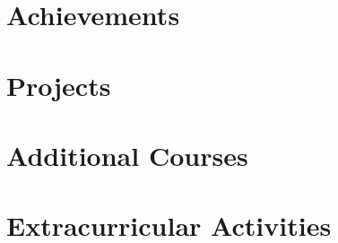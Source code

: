 \documentclass[letterpaper, 10pt]{article}
\begin{document}



\section{Achievements}
\label{achievements}




\section{Projects}
\label{projects}











\section{Additional Courses}




\section{Extracurricular Activities}


\end{document}

